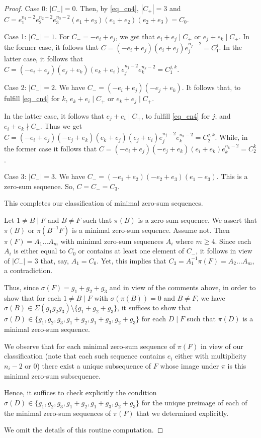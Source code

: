\documentclass{amsart}
\theoremstyle{definition}
\numberwithin{equation}{section}
\begin{document}
\begin{proof}
\noindent
Case 0: $|C_-|=0$. Then, by \eqref{eq_cn4}, $|C_+|=3$ and
$C=e_1^{n_1-2} e_2^{n_2-2} e_3^{n_3-2}(e_1+e_3)(e_1+e_2)(e_2+e_3)=C_0$.

\noindent
Case 1: $|C_-|=1$. For $C_-=-e_i+e_j$, we get that $e_i+e_j\mid C_+$ or $e_j+e_k\mid C_+$. In the former case, it follows that $C=(-e_i+e_j)(e_i+e_j)e_j^{n_j-2}=C_1^j$.
In the latter case, it follows that $C=(-e_i+e_j)(e_j+e_k)(e_k+e_i)e_j^{n_j-2}e_k^{n_k-2}=C_1^{j,k}$.

\noindent
Case 2: $|C_-|=2$. We have $C_-=(-e_i+e_j)(-e_j+e_k)$. It follows that,
to fulfill \eqref{eq_cn4} for $k$,
$e_k+e_i\mid C_+$ or $e_k+e_j\mid C_+$.

In the latter case,  it follows that $e_j+e_i\mid C_+$, to fulfill \eqref{eq_cn4} for $j$; and $e_i +e_k\nmid C_+$. Thus we get
$C = (-e_i + e_j) (-e_j + e_k) (e_k + e_j) (e_j + e_i) e_j^{n_j-2} e_k^{n_k-2}=C_2^{j,k}$.
While, in the former case it follows that
$C= (-e_i+e_j)(-e_j+e_k)(e_i+e_k)e_k^{n_k-2}=C_2^k$.

\noindent
Case 3: $|C_-|=3$. We have $C_- = (-e_1+e_2) (-e_2+e_3) (e_1-e_3)$. This is
a zero-sum sequence. So, $C= C_-=C_3$.

This completes our classification of minimal zero-sum sequences.

Let $1\neq B \mid F$ and $B \neq F$ such that $\pi(B)$ is a zero-sum sequence.
We assert that $\pi(B)$ or $\pi(B^{-1}F)$ is a minimal zero-sum sequence.
Assume not. Then $\pi(F)=A_1\dots A_m$  with minimal zero-sum sequences
$A_i$ where $m \ge 4$. Since each $A_i$ is either equal to $C_0$
or contains at least one element of $C_-$, it follows in view of $|C_-|=3$ that, say, $A_1=C_0$. Yet, this implies that $C_3=A_1^{-1}\pi(F)=A_2 \dots A_m$, a contradiction.

Thus, since $\sigma(F)=g_1+g_2+g_3$ and in view of the comments above, in order to show that
for each $1 \neq B \mid F$ with $\sigma(\pi(B))=0$ and $B \neq F$, we have
$\sigma(B) \in \Sigma(g_1g_2g_3) \setminus \{ g_1 + g_2 + g_3 \}$, it suffices to show that $\sigma(D) \in \{ g_1, g_2, g_3, g_1 + g_2, g_1 + g_3, g_2 + g_3 \}$ for each $D\mid F$ such that $\pi(D)$ is a minimal zero-sum sequence.

We observe that for each minimal zero-sum sequence of $\pi(F)$
in view of our classification (note that each such sequence
 contains $e_i$ either with multiplicity $n_i-2$ or $0$)
there exist a unique subsequence of $F$ whose image under $\pi$ is this minimal
zero-sum subsequence.

Hence, it suffices to check explicitly the condition
$\sigma(D)\in \{g_1,g_2,g_3, g_1+g_2,g_1+g_3 ,g_2+g_3\}$
for the unique preimage of each of the minimal zero-sum
sequences of $\pi(F)$ that we determined explicitly.

We omit the details of  this routine computation.
\end{proof}
\end{document}
